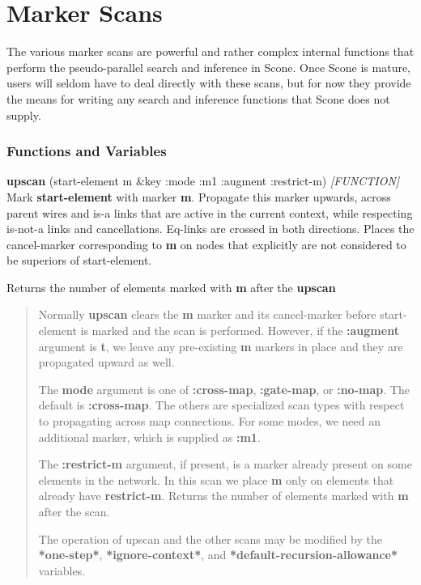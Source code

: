 \documentclass[titlepage,twoside,openright,11pt]{article}
\begin{document}
\section{Marker Scans}\label{marker-scans}

The various marker scans are powerful and rather complex internal
functions that perform the pseudo-parallel search and inference in
Scone. Once Scone is mature, users will seldom have to deal directly
with these scans, but for now they provide the means for writing any
search and inference functions that Scone does not supply.

\subsubsection{Functions and Variables}\label{functions-and-variables-9}

\textbf{upscan} (start-element m \&key :mode :m1 :augment :restrict-m)
\emph{{[}FUNCTION{]}}\\
Mark \textbf{start-element} with marker \textbf{m}. Propagate this
marker upwards, across parent wires and is-a links that are active in
the current context, while respecting is-not-a links and cancellations.
Eq-links are crossed in both directions. Places the cancel-marker
corresponding to \textbf{m} on nodes that explicitly are not considered
to be superiors of start-element.

Returns the number of elements marked with \textbf{m} after the
\textbf{upscan}

\begin{quote}
Normally \textbf{upscan} clears the \textbf{m} marker and its
cancel-marker before start-element is marked and the scan is performed.
However, if the \textbf{:augment} argument is \textbf{t}, we leave any
pre-existing \textbf{m} markers in place and they are propagated upward
as well.

The \textbf{mode} argument is one of \textbf{:cross-map},
\textbf{:gate-map}, or \textbf{:no-map}. The default is
\textbf{:cross-map}. The others are specialized scan types with respect
to propagating across map connections. For some modes, we need an
additional marker, which is supplied as \textbf{:m1}.

The \textbf{:restrict-m} argument, if present, is a marker already
present on some elements in the network. In this scan we place
\textbf{m} only on elements that already have \textbf{restrict-m}.
Returns the number of elements marked with \textbf{m} after the scan.

The operation of upscan and the other scans may be modified by the
\textbf{*one-step*}, \textbf{*ignore-context*}, and
\textbf{*default-recursion-allowance*} variables.
\end{quote}
\end{document}
